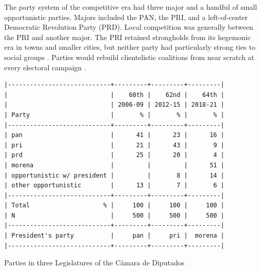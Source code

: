 \documentclass[letter,12pt]{article}
\begin{document}
The party system of the competitive era had three major and a handful of small opportunistic parties. Majors included the PAN, the PRI, and a left-of-center Democratic Revolution Party (PRD). Local competition was generally between the PRI and another major. The PRI retained strongholds from its hegemonic era in towns and smaller cities, but neither party had particularly strong ties to social groups \citep{moreno.decisElec.2009}. Parties would rebuild clientelistic coalitions from near scratch at every electoral campaign \citep{diaz-estevez-magaloni-Poverty-book.2016}.

\begin{table}
\begin{scriptsize}
\begin{verbatim}
|----------------------------+---------+---------+---------|
|                            |    60th |    62nd |    64th |
|                            | 2006-09 | 2012-15 | 2018-21 |
| Party                      |       % |       % |       % |
|----------------------------+---------+---------+---------|
| pan                        |      41 |      23 |      16 |
| pri                        |      21 |      43 |       9 |
| prd                        |      25 |      20 |       4 |
| morena                     |         |         |      51 |
| opportunistic w/ president |         |       8 |      14 |
| other opportunistic        |      13 |       7 |       6 |
|----------------------------+---------+---------+---------|
| Total                    % |     100 |     100 |     100 |
| N                          |     500 |     500 |     500 |
|----------------------------+---------+---------+---------|
| President's party          |     pan |     pri |  morena |
|----------------------------+---------+---------+---------|
\end{verbatim}
\end{scriptsize}
\caption{Parties in three Legislatures of the Cámara de Diputados}\label{T:seats}
\end{table}

\end{document}
